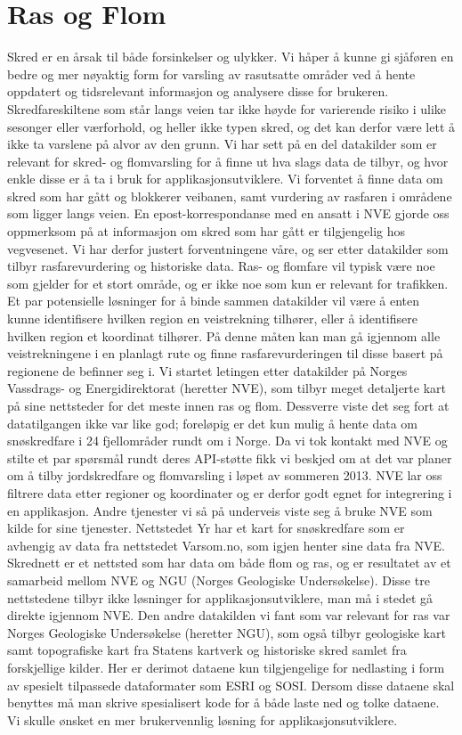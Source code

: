 \documentclass[a4paper,norsk,oneside]{book}
\begin{document}
\section{Ras og Flom}
 Skred er en årsak til både forsinkelser og ulykker. Vi håper å kunne gi sjåføren en bedre og mer nøyaktig form for varsling av rasutsatte områder ved å hente oppdatert og tidsrelevant informasjon og analysere disse for brukeren. Skredfareskiltene som står langs veien tar ikke høyde for varierende risiko i ulike sesonger eller værforhold, og heller ikke typen skred, og det kan derfor være lett å ikke ta varslene på alvor av den grunn.
    Vi har sett på en del datakilder som er relevant for skred- og flomvarsling for å finne ut hva slags data de tilbyr, og hvor enkle disse er å ta i bruk for applikasjonsutviklere. Vi forventet å finne data om skred som har gått og blokkerer veibanen, samt vurdering av rasfaren i områdene som ligger langs veien. En epost-korrespondanse med en ansatt i NVE gjorde oss oppmerksom på at informasjon om skred som har gått er tilgjengelig hos vegvesenet. Vi har derfor justert forventningene våre, og ser etter datakilder som tilbyr rasfarevurdering og historiske data.
    Ras- og flomfare vil typisk være noe som gjelder for et stort område, og er ikke noe som kun er relevant for trafikken. Et par potensielle løsninger for å binde sammen datakilder vil være å enten kunne identifisere hvilken region en veistrekning tilhører, eller å identifisere hvilken region et koordinat tilhører. På denne måten kan man gå igjennom alle veistrekningene i en planlagt rute og finne rasfarevurderingen til disse basert på regionene de befinner seg i.
	Vi startet letingen etter datakilder på Norges Vassdrags- og Energidirektorat (heretter NVE), som tilbyr meget detaljerte kart på sine nettsteder for det meste innen ras og flom.\cite{nve}  Dessverre viste det seg fort at datatilgangen ikke var like god; foreløpig er det kun mulig å hente data om snøskredfare i 24 fjellområder rundt om i Norge. Da vi tok kontakt med NVE og stilte et par spørsmål rundt deres API-støtte fikk vi beskjed om at det var planer om å tilby jordskredfare og flomvarsling i løpet av sommeren 2013. NVE lar oss filtrere data etter regioner og koordinater og er derfor godt egnet for integrering i en applikasjon.
	Andre tjenester vi så på underveis viste seg å bruke NVE som kilde for sine tjenester. Nettstedet Yr har et kart for snøskredfare som er avhengig av data fra nettstedet Varsom.no, som igjen henter sine data fra NVE.\cite{varsom} Skrednett \cite{skred} er et nettsted som har data om både flom og ras, og er resultatet av et samarbeid mellom NVE og NGU (Norges Geologiske Undersøkelse)\cite{ngu}. Disse tre nettstedene tilbyr ikke løsninger for applikasjonsutviklere, man må i stedet gå direkte igjennom NVE.
	Den andre datakilden vi fant som var relevant for ras var Norges Geologiske Undersøkelse (heretter NGU), som også tilbyr geologiske kart samt topografiske kart fra Statens kartverk og historiske skred samlet fra forskjellige kilder. Her er derimot dataene kun tilgjengelige for nedlasting i form av spesielt tilpassede dataformater som ESRI og SOSI.  Dersom disse dataene skal benyttes må man skrive spesialisert kode for å både laste ned og tolke dataene. Vi skulle ønsket en mer brukervennlig løsning for applikasjonsutviklere.
\end{document}
